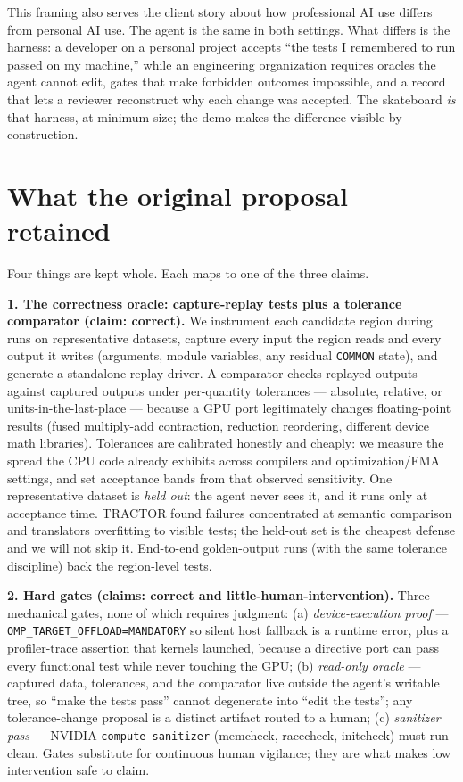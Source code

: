 \documentclass[11pt]{article}
\begin{document}
This framing also serves the client story about how professional AI use differs from personal AI use. The agent is the same in both settings. What differs is the harness: a developer on a personal project accepts ``the tests I remembered to run passed on my machine,'' while an engineering organization requires oracles the agent cannot edit, gates that make forbidden outcomes impossible, and a record that lets a reviewer reconstruct why each change was accepted. The skateboard \emph{is} that harness, at minimum size; the demo makes the difference visible by construction.

\section{What the original proposal retained}

Four things are kept whole. Each maps to one of the three claims.

\textbf{1. The correctness oracle: capture-replay tests plus a tolerance comparator (claim: correct).}
We instrument each candidate region during runs on representative datasets, capture every input the region reads and every output it writes (arguments, module variables, any residual \texttt{COMMON} state), and generate a standalone replay driver. A comparator checks replayed outputs against captured outputs under per-quantity tolerances --- absolute, relative, or units-in-the-last-place --- because a GPU port legitimately changes floating-point results (fused multiply-add contraction, reduction reordering, different device math libraries). Tolerances are calibrated honestly and cheaply: we measure the spread the CPU code already exhibits across compilers and optimization/FMA settings, and set acceptance bands from that observed sensitivity. One representative dataset is \emph{held out}: the agent never sees it, and it runs only at acceptance time. TRACTOR found failures concentrated at semantic comparison and translators overfitting to visible tests; the held-out set is the cheapest defense and we will not skip it. End-to-end golden-output runs (with the same tolerance discipline) back the region-level tests.

\textbf{2. Hard gates (claims: correct and little-human-intervention).}
Three mechanical gates, none of which requires judgment: (a) \emph{device-execution proof} --- \texttt{OMP\_TARGET\_OFFLOAD=MANDATORY} so silent host fallback is a runtime error, plus a profiler-trace assertion that kernels launched, because a directive port can pass every functional test while never touching the GPU; (b) \emph{read-only oracle} --- captured data, tolerances, and the comparator live outside the agent's writable tree, so ``make the tests pass'' cannot degenerate into ``edit the tests''; any tolerance-change proposal is a distinct artifact routed to a human; (c) \emph{sanitizer pass} --- NVIDIA \texttt{compute-sanitizer} (memcheck, racecheck, initcheck) must run clean. Gates substitute for continuous human vigilance; they are what makes low intervention safe to claim.
\end{document}

